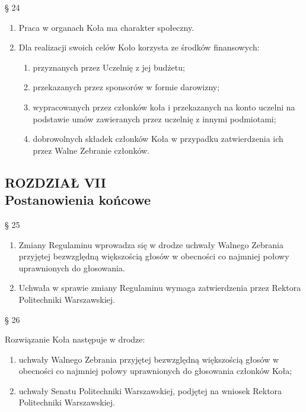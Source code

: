 \documentclass[a4paper,11pt]{article}
\renewcommand{\paragraph}[1] {\begin{center}§ {#1}\end{center}}
\newcommand{\content}[1] {\begin{flushleft}{#1}\end{flushleft}}
\newcommand{\chapter}[2] {\begin{center}\section*{ROZDZIAŁ {#1} \\ {#2}}\end{center}}
\begin{document}
\paragraph{24}
\begin{enumerate}
	\item Praca w organach Koła ma charakter społeczny.
	\item Dla realizacji swoich celów Koło korzysta ze środków finansowych:
	\begin{enumerate}
		\item przyznanych przez Uczelnię z jej budżetu;
		\item przekazanych przez sponsorów w formie darowizny;
		\item wypracowanych przez członków koła i przekazanych na konto uczelni na podstawie
	umów zawieranych przez uczelnię z innymi podmiotami;
		\item dobrowolnych  składek  członków  Koła w  przypadku  zatwierdzenia  ich przez  Walne
Zebranie członków.
	\end{enumerate}
\end{enumerate}

\chapter{VII}{Postanowienia końcowe}

\paragraph{25}
\begin{enumerate}
	\item Zmiany  Regulaminu  wprowadza  się  w  drodze  uchwały  Walnego  Zebrania  przyjętej
bezwzględną  większością  głosów  w  obecności  co  najmniej  połowy  uprawnionych  do
głosowania.
	\item Uchwała w sprawie zmiany Regulaminu wymaga zatwierdzenia przez Rektora Politechniki
Warszawskiej.
\end{enumerate}

\paragraph{26}
\content{Rozwiązanie Koła następuje w drodze:}
\begin{enumerate}
	\item uchwały Walnego Zebrania przyjętej bezwzględną większością głosów w obecności co
najmniej połowy uprawnionych do głosowania członków Koła;
	\item uchwały Senatu Politechniki Warszawskiej, podjętej na wniosek Rektora Politechniki
Warszawskiej.
\end{enumerate}
\end{document}
